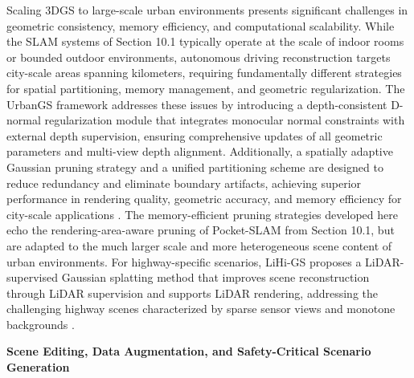 \documentclass[11pt]{article}
\begin{document}
Scaling 3DGS to large-scale urban environments presents significant challenges in geometric consistency, memory efficiency, and computational scalability. While the SLAM systems of Section 10.1 typically operate at the scale of indoor rooms or bounded outdoor environments, autonomous driving reconstruction targets city-scale areas spanning kilometers, requiring fundamentally different strategies for spatial partitioning, memory management, and geometric regularization. The UrbanGS framework addresses these issues by introducing a depth-consistent D-normal regularization module that integrates monocular normal constraints with external depth supervision, ensuring comprehensive updates of all geometric parameters and multi-view depth alignment. Additionally, a spatially adaptive Gaussian pruning strategy and a unified partitioning scheme are designed to reduce redundancy and eliminate boundary artifacts, achieving superior performance in rendering quality, geometric accuracy, and memory efficiency for city-scale applications \cite{ref225}. The memory-efficient pruning strategies developed here echo the rendering-area-aware pruning of Pocket-SLAM from Section 10.1, but are adapted to the much larger scale and more heterogeneous scene content of urban environments. For highway-specific scenarios, LiHi-GS proposes a LiDAR-supervised Gaussian splatting method that improves scene reconstruction through LiDAR supervision and supports LiDAR rendering, addressing the challenging highway scenes characterized by sparse sensor views and monotone backgrounds \cite{ref234}.

\textbf{Scene Editing, Data Augmentation, and Safety-Critical Scenario Generation}
\end{document}
